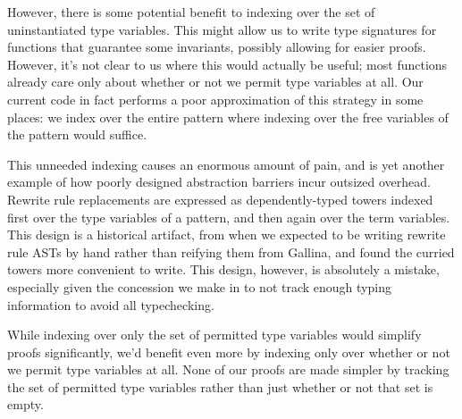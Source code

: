 However, there is some potential benefit to indexing over the set of uninstantiated type variables.
This might allow us to write type signatures for functions that guarantee some invariants, possibly allowing for easier proofs.
However, it's not clear to us where this would actually be useful; most functions already care only about whether or not we permit type variables at all.
Our current code in fact performs a poor approximation of this strategy in some places: we index over the entire pattern where indexing over the free variables of the pattern would suffice.

This unneeded indexing causes an enormous amount of pain, and is yet another example of how poorly designed abstraction barriers incur outsized overhead.
Rewrite rule replacements are expressed as dependently-typed towers indexed first over the type variables of a pattern, and then again over the term variables.
This design is a historical artifact, from when we expected to be writing rewrite rule ASTs by hand rather than reifying them from Gallina, and found the curried towers more convenient to write.
This design, however, is absolutely a mistake, especially given the concession we make in  to not track enough typing information to avoid all typechecking.

While indexing over only the set of permitted type variables would simplify proofs significantly, we'd benefit even more by indexing only over whether or not we permit type variables at all.
None of our proofs are made simpler by tracking the set of permitted type variables rather than just whether or not that set is empty.
%
%
%

